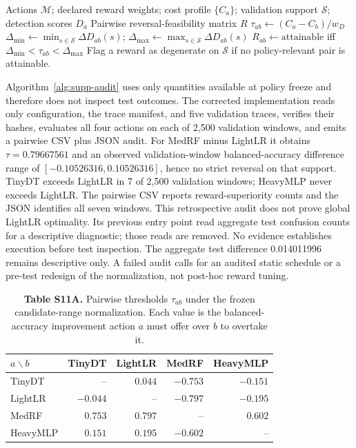 \documentclass[10pt,a4paper]{article}
\begin{document}
\begin{algorithm}[h!]
\caption{Validation-only reward audit}\label{alg:supp-audit}
\footnotesize
\begin{algorithmic}[1]
\REQUIRE Actions $\mathcal M$; declared reward weights; cost profile $\{C_a\}$; validation support $\mathcal S$; detection scores $D_a$
\ENSURE Pairwise reversal-feasibility matrix $R$
  \STATE $\tau_{ab}\leftarrow(C_a-C_b)/w_D$
  \STATE $\Delta_{\min}\leftarrow\min_{s\in\mathcal S}\Delta D_{ab}(s)$; $\Delta_{\max}\leftarrow\max_{s\in\mathcal S}\Delta D_{ab}(s)$
  \STATE $R_{ab}\leftarrow\text{attainable}$ iff $\Delta_{\min}<\tau_{ab}<\Delta_{\max}$
\ENDFOR
\STATE Flag a reward as degenerate on $\mathcal S$ if no policy-relevant pair is attainable.
\end{algorithmic}
\end{algorithm}

Algorithm~\ref{alg:supp-audit} uses only quantities available at policy freeze and therefore does not inspect test outcomes. The corrected implementation reads only configuration, the trace manifest, and five validation traces, verifies their hashes, evaluates all four actions on each of 2{,}500 validation windows, and emits a pairwise CSV plus JSON audit. For MedRF minus LightLR it obtains $\tau=0.79667561$ and an observed validation-window balanced-accuracy difference range of $[-0.10526316,0.10526316]$, hence no strict reversal on that support. TinyDT exceeds LightLR in 7 of 2{,}500 validation windows; HeavyMLP never exceeds LightLR. The pairwise CSV reports reward-superiority counts and the JSON identifies all seven windows. This retrospective audit does not prove global LightLR optimality. Its previous entry point read aggregate test confusion counts for a descriptive diagnostic; those reads are removed. No evidence establishes execution before test inspection. The aggregate test difference 0.014011996 remains descriptive only. A failed audit calls for an audited static schedule or a pre-test redesign of the normalization, not post-hoc reward tuning.

\begin{table}[h!]
\centering\small
\caption*{\textbf{Table S11A.} Pairwise thresholds $\tau_{ab}$ under the frozen candidate-range normalization. Each value is the balanced-accuracy improvement action $a$ must offer over $b$ to overtake it.}
\setlength{\tabcolsep}{6pt}
\begin{tabular}{lrrrr}\toprule
$a\backslash b$ & TinyDT & LightLR & MedRF & HeavyMLP\\\midrule
TinyDT     & --       & $0.044$  & $-0.753$ & $-0.151$\\
LightLR    & $-0.044$ & --       & $-0.797$ & $-0.195$\\
MedRF      & $0.753$  & $0.797$  & --       & $0.602$\\
HeavyMLP   & $0.151$  & $0.195$  & $-0.602$ & --\\
\bottomrule\end{tabular}
\end{table}
\end{document}
